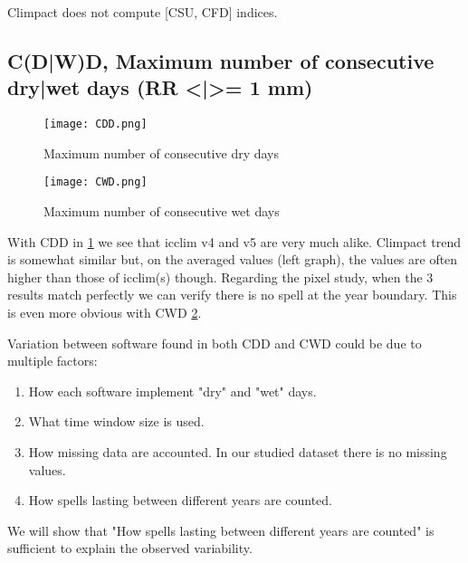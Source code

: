 \documentclass[a4paper,11pt]{article}
\begin{document}
        Climpact does not compute [CSU, CFD] indices.

        \subsection{C(D|W)D, Maximum number of consecutive dry|wet days (RR <|>= 1 mm)}
            \begin{figure}[h]
                \centering
                \texttt{[image: CDD.png]}
                \caption{Maximum number of consecutive dry days}
                \label{figure/cdd}
            \end{figure}
            \begin{figure}[h]
                \centering
                \texttt{[image: CWD.png]}
                \caption{Maximum number of consecutive wet days}
                \label{figure/cwd}
            \end{figure}

            With CDD in \ref{figure/cdd} we see that icclim v4 and v5 are very much alike.
            Climpact trend is somewhat similar but, on the averaged values (left graph), the values are often higher than those of icclim(s) though.
            Regarding the pixel study, when the 3 results match perfectly we can verify there is no spell at the year boundary.
            This is even more obvious with CWD \ref{figure/cwd}.

            Variation between software found in both CDD and CWD could be due to multiple factors:
            
            \begin{minipage}{\linewidth}
            \begin{enumerate}
                \item How each software implement "dry" and "wet" days.
                \item What time window size is used.
                \item How missing data are accounted. In our studied dataset there is no missing values.
                \item How spells lasting between different years are counted.
            \end{enumerate}
            \end{minipage}

            We will show that "How spells lasting between different years are counted" is sufficient to explain the observed variability.
\end{document}

